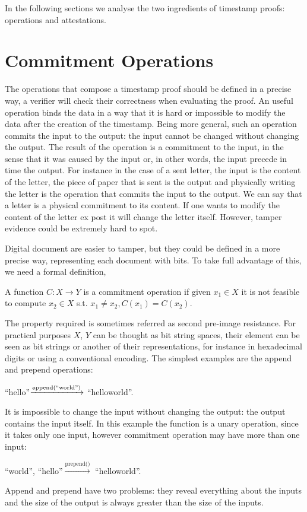 In the following sections we analyse the two ingredients of timestamp proofs: operations and attestations.

\section{Commitment Operations}

The operations that compose a timestamp proof should be defined in a precise way, a verifier will check their correctness when evaluating the proof. An useful operation binds the data in a way that it is hard or impossible to modify the data after the creation of the timestamp. Being more general, such an operation commits the input to the output: the input cannot be changed without changing the output. The result of the operation is a commitment to the input, in the sense that it was caused by the input or, in other words, the input precede in time the output.
For instance in the case of a sent letter, the input is the content of the letter, the piece of paper that is sent is the output and physically writing the letter is the operation that commits the input to the output. We can say that a letter is a physical commitment to its content. If one wants to modify the content of the letter ex post it will change the letter itself. However, tamper evidence could be extremely hard to spot.

Digital document are easier to tamper, but they could be defined in a more precise way, representing each document with bits. To take full advantage of this, we need a formal definition,
\begin{mydef}
	A function $C:X \rightarrow Y$ is a commitment operation if given $x_1 \in X$ it is not feasible to compute $x_2 \in X$ s.t. $x_1 \neq x_2, C(x_1)=C(x_2)$.
\end{mydef}
The property required is sometimes referred as second pre-image resistance. For practical purposes $X$, $Y$ can be thought as bit string spaces, their element can be seen as bit strings or another of their representations, for instance in hexadecimal digits or using a conventional encoding.
The simplest examples are the append and prepend operations:

\begin{myexample}
	\textquotedblleft hello\textquotedblright $\xrightarrow{\text{append(\textquotedblleft world\textquotedblright)}}$ \textquotedblleft helloworld\textquotedblright.
\end{myexample}
It is impossible to change the input without changing the output: the output contains the input itself. In this example the function is a unary operation, since it takes only one input, however commitment operation may have more than one input:
\begin{myexample}
	\textquotedblleft world\textquotedblright, \textquotedblleft hello\textquotedblright $\xrightarrow{\text{prepend()}}$ \textquotedblleft helloworld\textquotedblright.
\end{myexample}
Append and prepend have two problems: they reveal everything about the inputs and the size of the output is always greater than the size of the inputs. 

